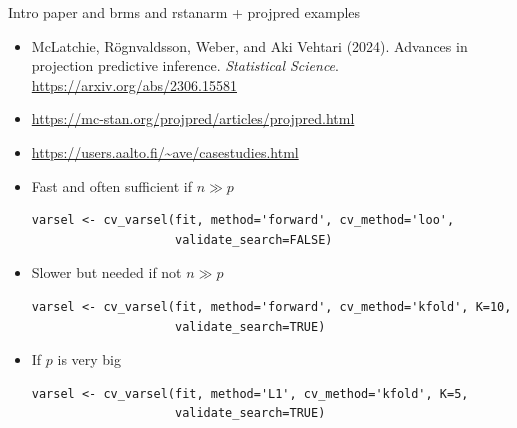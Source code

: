 \documentclass[t]{beamer}
\begin{document}

\begin{frame}[fragile]{Intro paper and brms and rstanarm + projpred examples}

\begin{itemize}
\item {\small McLatchie, Rögnvaldsson, Weber, and Aki Vehtari (2024). Advances in projection predictive inference. \emph{Statistical Science}. \url{https://arxiv.org/abs/2306.15581}}
\item \url{https://mc-stan.org/projpred/articles/projpred.html}
\item \url{https://users.aalto.fi/~ave/casestudies.html}
\item Fast and often sufficient if $n\gg p$\\
\begin{verbatim}
varsel <- cv_varsel(fit, method='forward', cv_method='loo',
                    validate_search=FALSE)
\end{verbatim}
\item Slower but needed if not $n\gg p$\\
\begin{verbatim}
varsel <- cv_varsel(fit, method='forward', cv_method='kfold', K=10,
                    validate_search=TRUE)
\end{verbatim}
\item If $p$ is very big\\
\begin{verbatim}
varsel <- cv_varsel(fit, method='L1', cv_method='kfold', K=5,
                    validate_search=TRUE)
\end{verbatim}
\end{itemize}

\end{frame}

  
  
\end{document}
